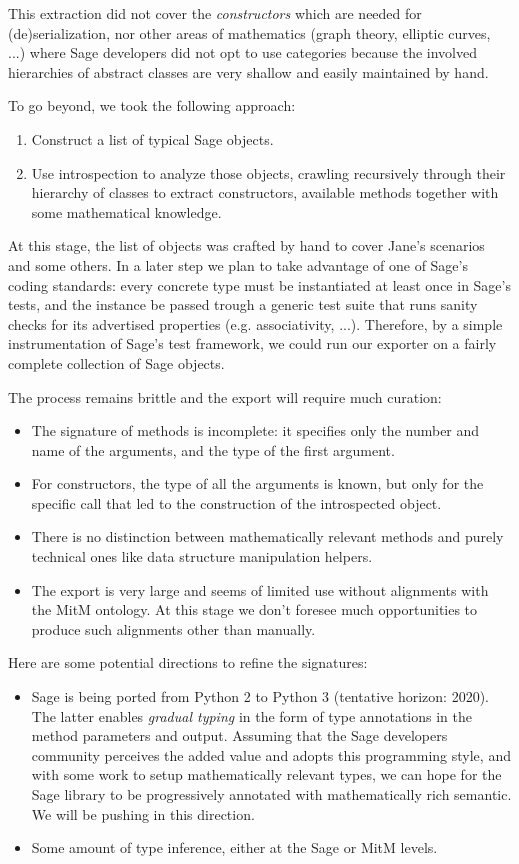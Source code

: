 This extraction did not cover the \emph{constructors} which are needed
for (de)serialization, nor other areas of mathematics (graph theory,
elliptic curves, ...) where Sage developers did not opt to use
categories because the involved hierarchies of abstract classes are
very shallow and easily maintained by hand.

To go beyond, we took the following approach:
\begin{enumerate}
\item Construct a list of typical Sage objects.
\item Use introspection to analyze those objects, crawling recursively
  through their hierarchy of classes to extract constructors,
  available methods together with some mathematical knowledge.
\end{enumerate}

At this stage, the list of objects was crafted by hand to cover Jane's
scenarios and some others. In a later step we plan to take advantage
of one of Sage's coding standards: every concrete type must be
instantiated at least once in Sage's tests, and the instance be passed
trough a generic test suite that runs sanity checks for its advertised
properties (e.g. associativity, ...). Therefore, by a simple
instrumentation of Sage's test framework, we could run our exporter on
a fairly complete collection of Sage objects.

The process remains brittle and the export will require much curation:
\begin{itemize}
\item The signature of methods is incomplete: it specifies only the
  number and name of the arguments, and the type of the first
  argument.
\item For constructors, the type of all the arguments is known, but
  only for the specific call that led to the construction of the
  introspected object.
\item There is no distinction between mathematically relevant methods
  and purely technical ones like data structure manipulation helpers.
\item The export is very large and seems of limited use without
  alignments with the MitM ontology. At this stage we don't foresee
  much opportunities to produce such alignments other than manually.
\end{itemize}

Here are some potential directions to refine the signatures:
\begin{itemize}
\item Sage is being ported from Python 2 to Python 3 (tentative
  horizon: 2020). The latter enables \emph{gradual typing} in the form
  of type annotations in the method parameters and output. Assuming
  that the Sage developers community perceives the added value and
  adopts this programming style, and with some work to setup
  mathematically relevant types, we can hope for the Sage library to
  be progressively annotated with mathematically rich semantic. We
  will be pushing in this direction.
\item Some amount of type inference, either at the Sage or MitM levels.
\end{itemize}

